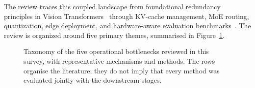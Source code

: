 \documentclass[10pt]{article}
\newenvironment{reviewchange}{\begingroup\color{red}}{\endgroup}
\begin{document}
The review traces this coupled landscape from foundational redundancy principles in
Vision Transformers~\citep{he2021maskedautoencodersscalablevision,jaegle2021perceivergeneralperceptioniterative,tong2022videomaemaskedautoencodersdataefficient} through KV-cache management,
MoE routing, quantization, edge deployment, and hardware-aware evaluation
benchmarks~\citep{kwon2023efficientmemorymanagementlarge,tschand2025mlperfpowerbenchmarkingenergy,John_2024,sukthanker2024hwgptbenchhardwareawarearchitecturebenchmark}.  The review is
organized around five primary themes, summarised in Figure~\ref{fig:taxonomy-tree}.

\begin{figure}[h]
\centering

\begin{reviewchange}
\caption{Taxonomy of the five operational bottlenecks reviewed in this survey, with
representative mechanisms and methods.  The rows organise the literature; they do not
imply that every method was evaluated jointly with the downstream stages.}
\label{fig:taxonomy-tree}
\end{reviewchange}
\end{figure}
\end{document}
